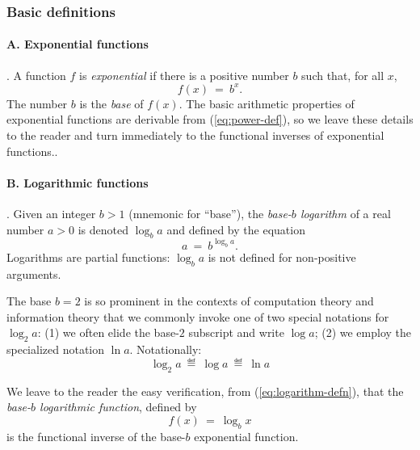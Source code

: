 \subsubsection{Basic definitions}

\paragraph{\small\sf A. Exponential functions}.
%
A function $f$ is {\it exponential} if there is a positive number $b$
such that, for all $x$,
\begin{equation}
\label{eq:exponential-defn}
f(x) \ = \ b^x.
\end{equation}
The number $b$ is the {\it base}
%
of $f(x)$.  The basic arithmetic properties of exponential functions
are derivable from (\ref{eq:power-def}), so we leave these details to
the reader and turn immediately to the functional inverses of
exponential functions..

\paragraph{\small\sf B. Logarithmic functions}.
%
Given an integer $b >1$ (mnemonic for ``base''), the {\em base-$b$
  logarithm}
%
of a real number $a > 0$ is denoted $\log_b a$ and defined by the
equation
\begin{equation}
\label{eq:logarithm-defn}
a \ = \ b^{\log_b a}.
\end{equation}
Logarithms are partial functions: $\log_b a$ is not defined for
non-positive arguments.

The base $b = 2$ is so prominent in the contexts of computation theory
and information theory that we commonly invoke one of two special
notations for $\log_2 a$: (1) we often elide the base-$2$ subscript
and write $\log a$;
(2) we employ the specialized notation $\ln a$.  Notationally:
\[ \log_2 a \ \eqdef \ \log a \ \eqdef \ \ln a \]

We leave to the reader the easy verification, from
(\ref{eq:logarithm-defn}), that the {\it base-$b$ logarithmic
  function}, defined by
\begin{equation}
\label{eq:log-function-defn}
f(x) \ = \ \log_b x
\end{equation}
is the functional inverse of the base-$b$ exponential function.

